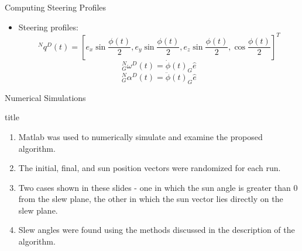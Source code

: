 \documentclass{beamer}
\begin{document}
\begin{frame}{Computing Steering Profiles}

\begin{block}{ }
\begin{itemize}
\item Steering profiles:
\begin{equation}
^Nq^D(t)=[e_x\sin\frac{\phi(t)}{2}, e_y\sin\frac{\phi(t)}{2}, e_z\sin\frac{\phi(t)}{2}, \cos\frac{\phi(t)}{2}]^T
\end{equation}
\begin{equation}
^N_G\omega^D(t)=\dot{\phi}(t)_G\hat{e}
\end{equation}
\begin{equation}
^N_G\alpha^D(t)=\ddot{\phi}(t)_G\hat{e}
\end{equation}
\end{itemize}
\end{block}
\end{frame}
\begin{frame}{Numerical Simulations} 
	\begin{block}{title}
		\begin{enumerate}
			\item Matlab was used to numerically simulate and examine the proposed algorithm. 
			\item The initial, final, and sun position vectors were randomized for each run. 
			\item Two cases shown in these slides - one in which the sun angle is greater than 0 from the slew plane, the other in which the sun vector lies directly on the slew plane. 
			\item Slew angles were found using the methods discussed in the description of the algorithm. 
		\end{enumerate}
	\end{block}
\end{frame}
\end{document}
